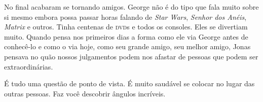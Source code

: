 No final acabaram se tornando amigos. George não é do tipo que fala muito sobre si mesmo embora possa passar horas falando de \emph{Star Wars}, \emph{Senhor dos Anéis}, \emph{Matrix} e outros. Tinha centenas de \textsc{dvd}s e todos os consoles. Eles se divertiam muito. Quando pensa nos primeiros dias a forma como ele via George antes de conhecê-lo e como o via hoje, como seu grande amigo, seu melhor amigo, Jonas pensava no quão nossos julgamentos podem nos afastar de pessoas que podem ser extraordinárias.

É tudo uma questão de ponto de vista. É muito saudável se colocar no lugar das outras pessoas. Faz você descobrir ângulos incríveis.
